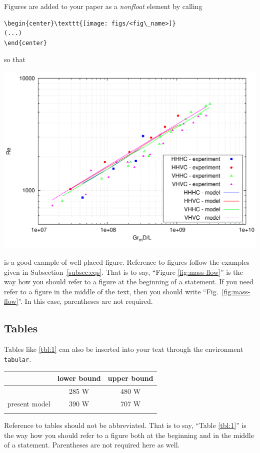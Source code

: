 \documentclass[date]{ppgem}
\begin{document}
\begin{multicols}{2}
Figures are added to your paper as a \emph{nonfloat} element by calling 
\begin{verbatim}
\begin{center}\texttt{[image: figs/<fig\_name>]} 
(...)
\end{center}
\end{verbatim}
so that
\begin{center}
\includegraphics[width=.6\columnwidth]{figs/example}
\label{fig:mass-flow}
\end{center}
is a good example of well placed figure. Reference to figures follow the examples given in Subsection~\ref{subsec:eqs}. That is to say, ``Figure \eqref{fig:mass-flow}'' is the way how you should refer to a figure at the beginning of a statement. If you need refer to a figure in the middle of the text, then you should write ``Fig.~\ref{fig:mass-flow}''. In this case, parentheses are not required.

\subsection{Tables}

Tables like \ref{tbl:1} can also be inserted into your text through the environment \verb|tabular|.
\begin{center}
  \begin{tabular}{ccc}
    \hline
    & lower bound & upper bound\\
    \hline
    \citet{ambrosini2004} & 285 W & 480 W\\
    present model & 390 W & 707 W\\
    \hline\\
  \end{tabular}
  \label{tbl:1}
\end{center}
Reference to tables should not be abbreviated. That is to say, ``Table \ref{tbl:1}'' is the way how you should refer to a figure both at the beginning and in the middle of a statement. Parentheses are not required here as well.

\end{multicols}
\end{document}
